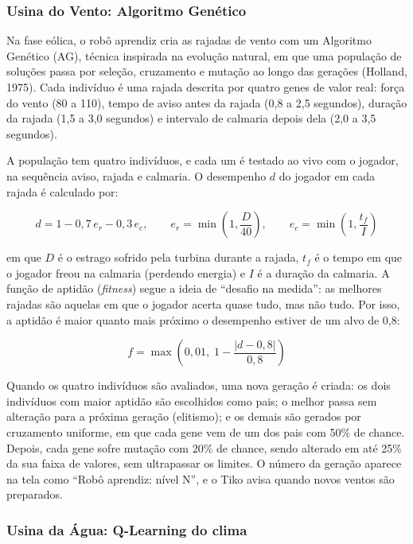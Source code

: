 \documentclass[12pt,a4paper]{article}
\begin{document}
\subsubsection{Usina do Vento: Algoritmo Genético}

Na fase eólica, o robô aprendiz cria as rajadas de vento com um Algoritmo Genético (AG), técnica inspirada na evolução natural, em que uma população de soluções passa por seleção, cruzamento e mutação ao longo das gerações (Holland, 1975). Cada indivíduo é uma rajada descrita por quatro genes de valor real: força do vento (80 a 110), tempo de aviso antes da rajada (0,8 a 2,5 segundos), duração da rajada (1,5 a 3,0 segundos) e intervalo de calmaria depois dela (2,0 a 3,5 segundos).

A população tem quatro indivíduos, e cada um é testado ao vivo com o jogador, na sequência aviso, rajada e calmaria. O desempenho $d$ do jogador em cada rajada é calculado por:

\begin{equation}
d = 1 - 0{,}7\,e_r - 0{,}3\,e_c, \qquad e_r = \min\!\left(1, \frac{D}{40}\right), \qquad e_c = \min\!\left(1, \frac{t_f}{I}\right)
\end{equation}

\noindent em que $D$ é o estrago sofrido pela turbina durante a rajada, $t_f$ é o tempo em que o jogador freou na calmaria (perdendo energia) e $I$ é a duração da calmaria. A função de aptidão (\textit{fitness}) segue a ideia de ``desafio na medida'': as melhores rajadas são aquelas em que o jogador acerta quase tudo, mas não tudo. Por isso, a aptidão é maior quanto mais próximo o desempenho estiver de um alvo de 0,8:

\begin{equation}
f = \max\!\left(0{,}01,\; 1 - \frac{|d - 0{,}8|}{0{,}8}\right)
\end{equation}

Quando os quatro indivíduos são avaliados, uma nova geração é criada: os dois indivíduos com maior aptidão são escolhidos como pais; o melhor passa sem alteração para a próxima geração (elitismo); e os demais são gerados por cruzamento uniforme, em que cada gene vem de um dos pais com 50\% de chance. Depois, cada gene sofre mutação com 20\% de chance, sendo alterado em até 25\% da sua faixa de valores, sem ultrapassar os limites. O número da geração aparece na tela como ``Robô aprendiz: nível N'', e o Tiko avisa quando novos ventos são preparados.

\subsubsection{Usina da Água: Q-Learning do clima}
\end{document}
